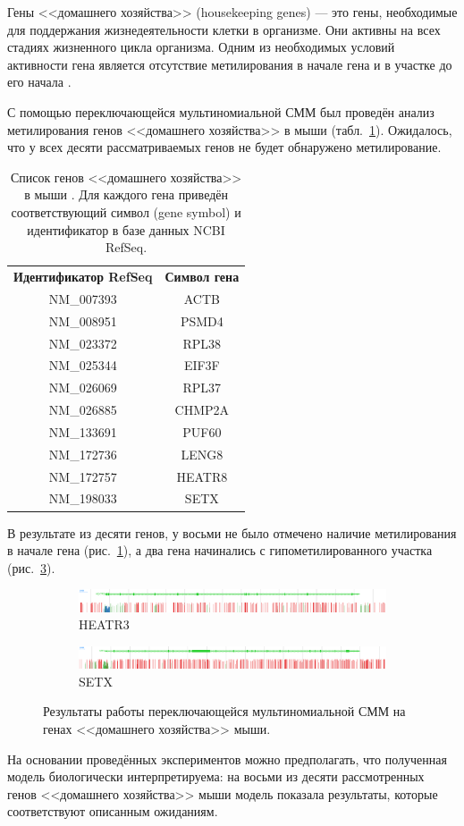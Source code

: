 Гены <<домашнего хозяйства>> (housekeeping genes) --- это гены, необходимые для
поддержания жизнедеятельности клетки в организме. Они активны на всех стадиях
жизненного цикла организма. Одним из необходимых условий активности гена является
отсутствие метилирования в начале гена и в участке до его начала \cite{Jones2012}.

С помощью переключающейся мультиномиальной СММ был проведён анализ метилирования генов
<<домашнего хозяйства>> в мыши (табл.~\ref{tab:housekeeping}). Ожидалось, что у всех
десяти рассматриваемых генов не будет обнаружено метилирование.

\begin{table}[htbp!]
  \centering
  \begin{tabular}{cc}
    \textbf{Идентификатор RefSeq} & \textbf{Символ гена} \\
    \noalign{\nobreak\smallskip}
    NM\_007393 & ACTB \\
    NM\_008951 & PSMD4 \\
    NM\_023372 & RPL38 \\
    NM\_025344 & EIF3F \\
    NM\_026069 & RPL37 \\
    NM\_026885 & CHMP2A \\
    NM\_133691 & PUF60 \\
    NM\_172736 & LENG8 \\
    NM\_172757 & HEATR8 \\
    NM\_198033 & SETX
  \end{tabular}
  \caption{Список генов <<домашнего хозяйства>> в мыши \cite{Kouadjo2007}. Для каждого
    гена приведён соответствующий символ (gene symbol) и идентификатор в базе данных NCBI
    RefSeq.}
  \label{tab:housekeeping}
\end{table}

В результате из десяти генов, у восьми не было отмечено наличие метилирования в начале гена
(рис.~\ref{fig:heatr3}), а два гена начинались с гипометилированного участка (рис.~\ref{fig:setx}).

\begin{figure}[htbp!]
  \centering
  \begin{subfigure}{\textwidth}
    \centering
    \includegraphics[width=\textwidth]{images/HEATR3}
    \caption{HEATR3}
    \label{fig:heatr3}
  \end{subfigure}
  \par\bigskip
  \begin{subfigure}{\textwidth}
    \centering
    \includegraphics[width=\textwidth]{images/SETX}
    \caption{SETX}
    \label{fig:setx}
  \end{subfigure}
  \caption{Результаты работы переключающейся мультиномиальной СММ на генах <<домашнего хозяйства>> мыши.}
\end{figure}

На основании проведённых экспериментов можно предполагать, что полученная модель биологически
интерпретируема: на восьми из десяти рассмотренных генов <<домашнего хозяйства>> мыши модель
показала результаты, которые соответствуют описанным ожиданиям.
